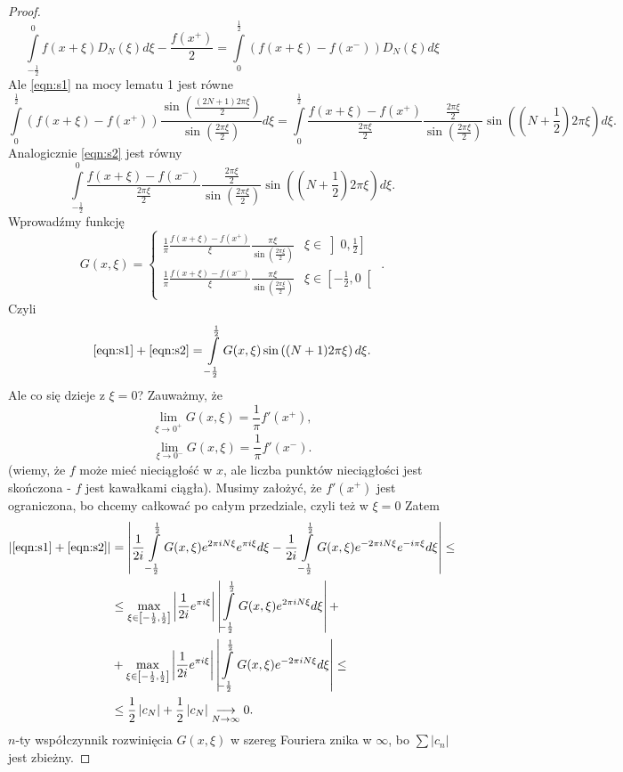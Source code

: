 \documentclass[../main.tex]{subfiles}
\begin{document}
\begin{proof}
\begin{equation}
    \label{eqn:s2}
    \int\limits_{-\frac{1}{2}}^{0} f(x+\xi)D_N(\xi)d\xi - \frac{f(x^+)}{2} = \int\limits_{0}^{\frac{1}{2}} \left(f(x+\xi) - f(x^-) \right)D_N(\xi)d\xi \tag{$OOO$}
\end{equation}
Ale \eqref{eqn:s1} na mocy lematu 1 jest równe
\[
    \int\limits_{0}^{\frac{1}{2}} \left( f(x+\xi) - f(x^+) \right) \frac{\sin\left( \frac{(2N+1)2\pi \xi}{2} \right)}{\sin\left( \frac{2\pi\xi}{2} \right) }d\xi = \int\limits_{0}^{\frac{1}{2}} \frac{f(x+\xi) - f(x^+)}{\frac{2\pi\xi}{2}}\frac{\frac{2\pi\xi}{2}}{\sin\left( \frac{2\pi\xi}{2} \right) }\sin\left( \left(N+\frac{1}{2}\right)2\pi\xi \right) d\xi
.\]
Analogicznie \eqref{eqn:s2} jest równy
\[
    \int\limits_{-\frac{1}{2}}^{0} \frac{f(x+\xi) - f(x^-)}{\frac{2\pi\xi}{2}}\frac{\frac{2\pi\xi}{2}}{\sin\left( \frac{2\pi\xi}{2} \right) }\sin\left( \left(N+\frac{1}{2}\right)2\pi\xi \right) d\xi
.\]
Wprowadźmy funkcję
\[
    G(x,\xi) = \begin{cases}
        \frac{1}{\pi}\frac{f(x+\xi) - f(x^+)}{\xi}\frac{\pi\xi}{\sin\left( \frac{2\pi\xi}{2} \right) } & \xi\in\left]0,\frac{1}{2}\right]\\
        \frac{1}{\pi}\frac{f(x+\xi) - f(x^-)}{\xi}\frac{\pi\xi}{\sin\left( \frac{2\pi\xi}{2} \right) }  & \xi\in\left[ -\frac{1}{2},0 \right[
    \end{cases}
.\]
Czyli
\[
    \eqref{eqn:s1} + \eqref{eqn:s2} = \int\limits_{-\frac{1}{2}}^{\frac{1}{2}} G(x,\xi)\sin\left( (N+1)2\pi\xi \right)d\xi
.\]
Ale co się dzieje z $\xi = 0$? Zauważmy, że
\[
    \lim_{\xi \to 0^+}G(x,\xi) = \frac{1}{\pi}f'(x^+)
,\]
\[
    \lim_{\xi \to 0^-}G(x,\xi) = \frac{1}{\pi}f'(x^-)
.\]
(wiemy, że $f$ może mieć nieciągłość w $x$, ale liczba punktów nieciągłości jest skończona - $f$ jest kawałkami ciągła).
Musimy założyć, że $f'(x^+)$ jest ograniczona, bo chcemy całkować po całym przedziale, czyli też w $\xi = 0$
Zatem
\begin{align*}
    \left|\eqref{eqn:s1} + \eqref{eqn:s2}\right| &= \left|\frac{1}{2i}\int\limits_{-\frac{1}{2}}^{\frac{1}{2}} G(x,\xi)e^{2\pi i N \xi}e^{\pi i \xi}d\xi - \frac{1}{2i}\int\limits_{-\frac{1}{2}}^{\frac{1}{2}} G(x,\xi)e^{-2\pi i N \xi}e^{-i \pi \xi}d\xi \right| \le \\
    &\le \max\limits_{\xi\in\left[ -\frac{1}{2},\frac{1}{2} \right] }\left| \frac{1}{2i}e^{\pi i \xi} \right| \left| \int\limits_{-\frac{1}{2}}^{\frac{1}{2}} G(x,\xi)e^{2\pi iN\xi}d\xi  \right| + \\
    &+ \max\limits_{\xi\in\left[ -\frac{1}{2},\frac{1}{2} \right] }\left| \frac{1}{2i}e^{\pi i \xi} \right| \left| \int\limits_{-\frac{1}{2}}^{\frac{1}{2}} G(x,\xi)e^{-2\pi iN\xi}d\xi  \right| \le \\
    &\le \frac{1}{2} \left| c_N \right| + \frac{1}{2}\left| c_N \right| \underset{N\to \infty}{\longrightarrow} 0
.\end{align*}
$n$-ty współczynnik rozwinięcia $G(x,\xi)$ w szereg Fouriera znika w $\infty$, bo $\sum \left| c_n \right| $ jest zbieżny.
\end{proof}
\end{document}
